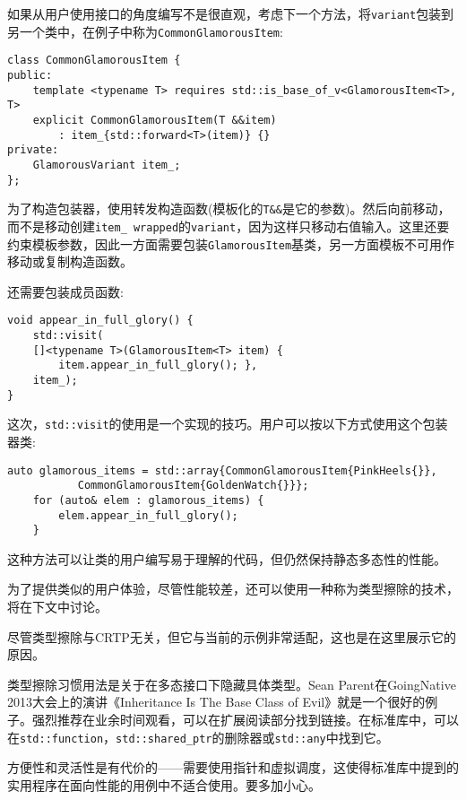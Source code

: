 如果从用户使用接口的角度编写不是很直观，考虑下一个方法，将\texttt{variant}包装到另一个类中，在例子中称为\texttt{CommonGlamorousItem}:

\begin{lstlisting}[style=styleCXX]
class CommonGlamorousItem {
public:
	template <typename T> requires std::is_base_of_v<GlamorousItem<T>, T>
	explicit CommonGlamorousItem(T &&item)
		: item_{std::forward<T>(item)} {}
private:
	GlamorousVariant item_;
};
\end{lstlisting}

为了构造包装器，使用转发构造函数(模板化的\texttt{T\&\&}是它的参数)。然后向前移动，而不是移动创建\texttt{item\_ wrapped}的\texttt{variant}，因为这样只移动右值输入。这里还要约束模板参数，因此一方面需要包装\texttt{GlamorousItem}基类，另一方面模板不可用作移动或复制构造函数。

还需要包装成员函数:

\begin{lstlisting}[style=styleCXX]
void appear_in_full_glory() {
	std::visit(
	[]<typename T>(GlamorousItem<T> item) {
		item.appear_in_full_glory(); },
	item_);
}
\end{lstlisting}

这次，\texttt{std::visit}的使用是一个实现的技巧。用户可以按以下方式使用这个包装器类:

\begin{lstlisting}[style=styleCXX]
auto glamorous_items = std::array{CommonGlamorousItem{PinkHeels{}},
		   CommonGlamorousItem{GoldenWatch{}}};
	for (auto& elem : glamorous_items) {
		elem.appear_in_full_glory();
	}
\end{lstlisting}

这种方法可以让类的用户编写易于理解的代码，但仍然保持静态多态性的性能。

为了提供类似的用户体验，尽管性能较差，还可以使用一种称为类型擦除的技术，将在下文中讨论。


尽管类型擦除与CRTP无关，但它与当前的示例非常适配，这也是在这里展示它的原因。

类型擦除习惯用法是关于在多态接口下隐藏具体类型。Sean Parent在GoingNative 2013大会上的演讲《Inheritance Is The Base Class of Evil》就是一个很好的例子。强烈推荐在业余时间观看，可以在扩展阅读部分找到链接。在标准库中，可以在\texttt{std::function}，\texttt{std::shared\_ptr}的删除器或\texttt{std::any}中找到它。

方便性和灵活性是有代价的——需要使用指针和虚拟调度，这使得标准库中提到的实用程序在面向性能的用例中不适合使用。要多加小心。

